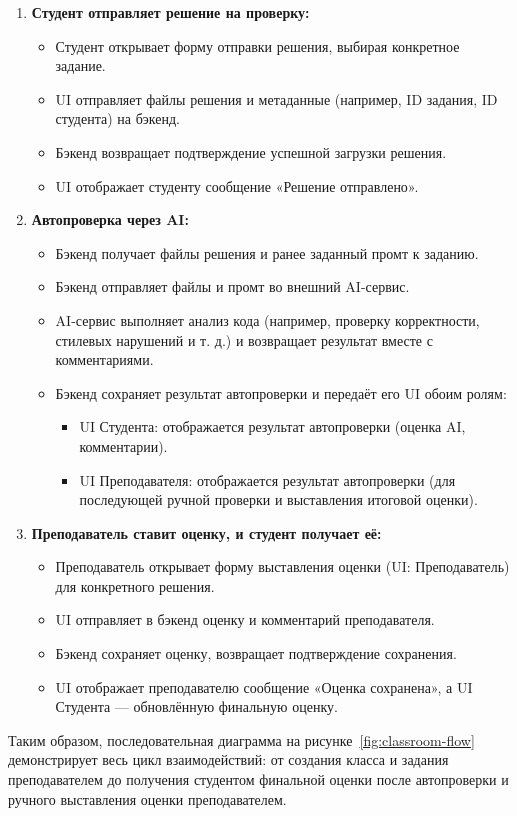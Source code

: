 \begin{enumerate}
    \item \textbf{Студент отправляет решение на проверку:}
    \begin{itemize}
        \item Студент открывает форму отправки решения, выбирая конкретное задание.
        \item UI отправляет файлы решения и метаданные (например, ID задания, ID студента) на бэкенд.
        \item Бэкенд возвращает подтверждение успешной загрузки решения.
        \item UI отображает студенту сообщение «Решение отправлено».
    \end{itemize}

    \item \textbf{Автопроверка через AI:}
    \begin{itemize}
        \item Бэкенд получает файлы решения и ранее заданный промт к заданию.
        \item Бэкенд отправляет файлы и промт во внешний AI-сервис.
        \item AI-сервис выполняет анализ кода (например, проверку корректности, стилевых нарушений и т. д.) и возвращает результат вместе с комментариями.
        \item Бэкенд сохраняет результат автопроверки и передаёт его UI обоим ролям:
        \begin{itemize}
            \item UI Студента: отображается результат автопроверки (оценка AI, комментарии).
            \item UI Преподавателя: отображается результат автопроверки (для последующей ручной проверки и выставления итоговой оценки).
        \end{itemize}
    \end{itemize}

    \item \textbf{Преподаватель ставит оценку, и студент получает её:}
    \begin{itemize}
        \item Преподаватель открывает форму выставления оценки (UI: Преподаватель) для конкретного решения.
        \item UI отправляет в бэкенд оценку и комментарий преподавателя.
        \item Бэкенд сохраняет оценку, возвращает подтверждение сохранения.
        \item UI отображает преподавателю сообщение «Оценка сохранена», а UI Студента — обновлённую финальную оценку.
    \end{itemize}
\end{enumerate}

Таким образом, последовательная диаграмма на рисунке~\ref{fig:classroom-flow} демонстрирует весь цикл взаимодействий: от создания класса и задания преподавателем до получения студентом финальной оценки после автопроверки и ручного выставления оценки преподавателем.
